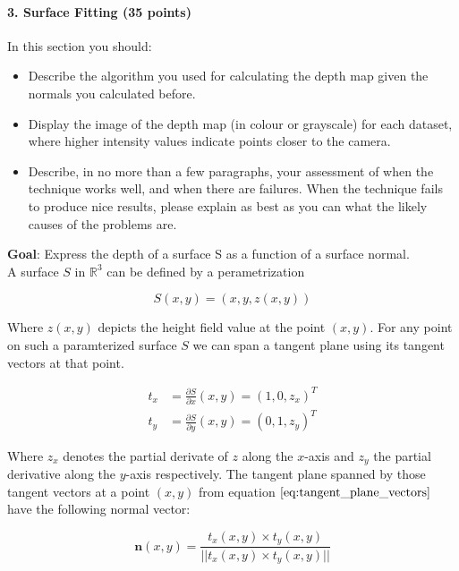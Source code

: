 \documentclass{paper}
\begin{document}
\paragraph{3. Surface Fitting (35 points)}

In this section you should: 

\begin{itemize}
\item Describe the algorithm you used for calculating the depth map given the normals you calculated before.
\item Display the image of the depth map (in colour or grayscale) for each dataset, where higher intensity values indicate points closer to the camera.
\item Describe, in no more than a few paragraphs, your assessment of when the technique works well, and when there are failures. When the technique fails to produce nice results, please explain as best as you can what the likely causes of the problems are.
\end{itemize}


\textbf{Goal}: Express the depth of a surface S as a function of a surface normal. \\
A surface $S$ in $\mathbb{R}^3$ can be defined by a perametrization 

\begin{equation}
    S(x,y) = (x,y,z(x,y))
\end{equation}

Where $z(x,y)$ depicts the height field value at the point $(x,y)$. For any point on such a paramterized surface $S$ we can span a tangent plane using its tangent vectors at that point.

\begin{align}
    t_x &= \frac{\partial S}{\partial x}(x,y) = (1,0,z_x)^T \nonumber \\
    t_y &= \frac{\partial S}{\partial y}(x,y) = (0,1,z_y)^T
\label{eq:tangent_plane_vectors}
\end{align}

Where $z_x$ denotes the partial derivate of $z$ along the $x$-axis and $z_y$ the partial derivative along the $y$-axis respectively. The tangent plane spanned by those tangent vectors at a point $(x,y)$ from equation $\ref{eq:tangent_plane_vectors}$ have the following normal vector:

\begin{equation}
    \textbf{n}(x,y) = \frac{t_x(x,y) \times t_y(x,y)}{|| t_x(x,y) \times t_y(x,y)||}
\label{eq:tan_plane_normal}
\end{equation}
\end{document}
